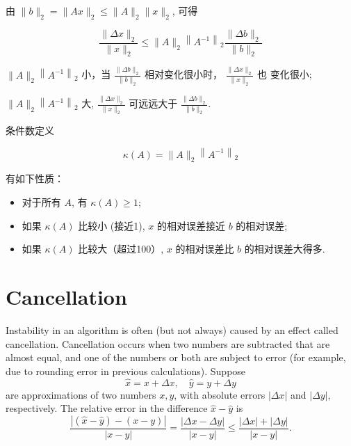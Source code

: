 由 $ \|b\|_{2}=\|A x\|_{2} \leq\|A\|_{2}\|x\|_{2} $, 可得

$$ \frac{\|\Delta x\|_{2}}{\|x\|_{2}} \leq\|A\|_{2}\left\|A^{-1}\right\|_{2} \frac{\|\Delta b\|_{2}}{\|b\|_{2}} $$

$ \|A\|_{2}\left\|A^{-1}\right\|_{2} $ 小，当 $ \frac{\|\Delta b\|_{2}}{\|b\|_{2}}  $ 相对变化很小时， $ \frac{\|\Delta x\|_{2}}{\|x\|_{2}}  $ 也 变化很小;

$ \|A\|_{2}\left\|A^{-1}\right\|_{2} $ 大, $ \frac{\|\Delta x\|_{2}}{\|x\|_{2}}  $ 可远远大于 $ \frac{\|\Delta b\|_{2}}{\|b\|_{2}}  $.


\begin{definition}        
    条件数定义

    $$ \kappa(A)=\|A\|_{2}\left\|A^{-1}\right\|_{2} $$
\end{definition}

\begin{corollary}
    有如下性质：

    \begin{itemize}
        \item 对于所有 $ A $, 有 $ \kappa(A) \geq 1 $;
        \item 如果 $ \kappa(A) $ 比较小 (接近1),  $ x $ 的相对误差接近 $ b $ 的相对误差;
        \item 如果 $ \kappa(A) $ 比较大（超过100）,  $ x $ 的相对误差比 $ b $ 的相对误差大得多. 
    \end{itemize}
\end{corollary}



\section{Cancellation}

Instability in an algorithm is often (but not always) caused by an effect called cancellation. Cancellation occurs when two numbers are subtracted that are almost equal, and one of the numbers or both are subject to error (for example, due to rounding error in previous calculations).
Suppose
$$
\hat{x}=x+\Delta x, \quad \hat{y}=y+\Delta y
$$
are approximations of two numbers $ x, y $, with absolute errors $ |\Delta x| $ and $ |\Delta y| $, respectively. The relative error in the difference $ \hat{x}-\hat{y} $ is
$$
\frac{|(\hat{x}-\hat{y})-(x-y)|}{|x-y|}=\frac{|\Delta x-\Delta y|}{|x-y|} \leq \frac{|\Delta x|+|\Delta y|}{|x-y|} .
$$

